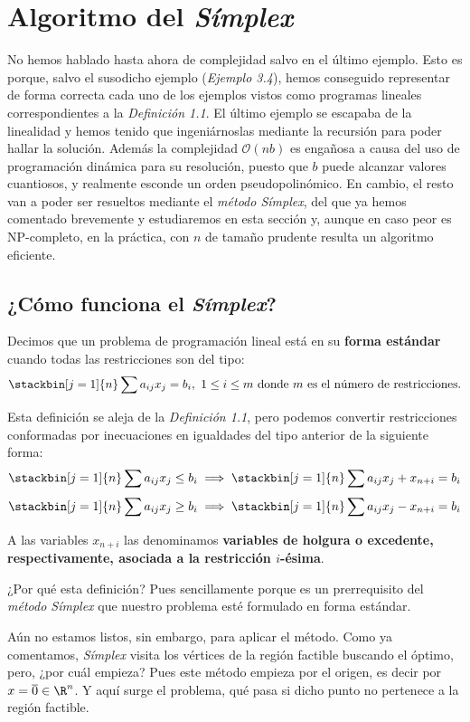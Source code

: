 \section{Algoritmo del \textit{Símplex}}
No hemos hablado hasta ahora de complejidad salvo en el último ejemplo. Esto es porque, salvo el susodicho ejemplo (\textit{Ejemplo 3.4}), hemos conseguido representar de forma correcta cada uno de los ejemplos vistos como programas lineales correspondientes a la \textit{Definición 1.1}. El último ejemplo se escapaba de la linealidad y hemos tenido que ingeniárnoslas mediante la recursión para poder hallar la solución. Además la complejidad $\mathcal{O}(nb)$ es engañosa a causa del uso de programación dinámica para su resolución, puesto que $b$ puede alcanzar valores cuantiosos, y realmente esconde un orden pseudopolinómico. En cambio, el resto van a poder ser resueltos mediante el \textit{método Símplex}, del que ya hemos comentado brevemente y estudiaremos en esta sección y, aunque en caso peor es NP-completo, en la práctica, con $n$ de tamaño prudente resulta un algoritmo eficiente.
\subsection{¿Cómo funciona el \textit{Símplex}?}
\begin{defi} Decimos que un problema de programación lineal está en su \textbf{forma estándar} cuando todas las restricciones son del tipo:
\[\stackbin[j=1]{n}\sum a_{ij}x_j=b_i,\ 1\leq i\leq m\mathrm{\ donde\ }m\mathrm{\ es\ el\ n\acute{u}mero\ de\ restricciones.}\]

Esta definición se aleja de la \textit{Definición 1.1}, pero podemos convertir restricciones conformadas por inecuaciones en igualdades del tipo anterior de la siguiente forma:
\[\stackbin[j=1]{n}\sum a_{ij}x_j\leq b_i\implies \stackbin[j=1]{n}\sum a_{ij}x_j+x_{n+i}=b_i\]
\[\stackbin[j=1]{n}\sum a_{ij}x_j\geq b_i\implies \stackbin[j=1]{n}\sum a_{ij}x_j-x_{n+i}=b_i\]

A las variables $x_{n+i}$ las denominamos \textbf{variables de holgura o excedente, respectivamente, asociada a la restricción $i$-ésima}.
\end{defi}

¿Por qué esta definición? Pues sencillamente porque es un prerrequisito del \textit{método Símplex} que nuestro problema esté formulado en forma estándar.

Aún no estamos listos, sin embargo, para aplicar el método. Como ya comentamos, \textit{Símplex} visita los vértices de la región factible buscando el óptimo, pero, ¿por cuál empieza? Pues este método empieza por el origen, es decir por $x=\overline{0}\in\R^n$. Y aquí surge el problema, qué pasa si dicho punto no pertenece a la región factible.\\

